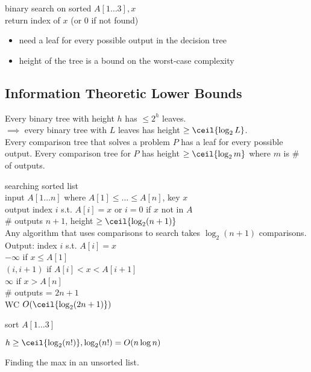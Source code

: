 \mpex

\noindent binary search on sorted $A[1 \ldots 3],x$ \\
return index of $x$ (or 0 if not found) 

\begin{itemize}
	\item need a leaf for every possible output in the decision tree
	\item height of the tree is a bound on the worst-case complexity
\end{itemize}

\subsection*{Information Theoretic Lower Bounds}

\noindent Every binary tree with height $h$ has $\leq 2^h$ leaves. \\
$\implies$ every binary tree with $L$ leaves has height $\geq \ceil{\log_2 L}$.
\\

\noindent Every comparison tree that solves a problem $P$ has a leaf for every
possible output. Every comparison tree for $P$ has height $\geq \ceil{\log_2 m}$
where $m$ is \# of outputs. \\

\mpex

\noindent searching sorted list \\
input $A[1 \ldots n]$ where $A[1] \leq \ldots \leq A[n]$, key $x$ \\
output index $i$ s.t. $A[i]=x$ or $i=0$ if $x$ not in $A$ \\
\# outputs $n+1$, height $\geq \ceil{\log_2 (n+1)}$ \\

\noindent Any algorithm that uses comparisons to search takes $\log_2 (n+1)$
comparisons.\\

\noindent Output: index $i$ s.t. $A[i]=x$ \\
$- \infty$ if $x \leq A[1]$ \\
$(i,i+1)$ if $A[i] < x < A[i+1]$ \\
$\infty$ if $x > A[n]$ \\

\noindent \# outputs = $2n+1$ \\

\noindent WC $O(\ceil{\log_2 (2n+1)})$ \\

\mpex

\noindent sort $A[1 \ldots 3]$

\noindent $h \geq \ceil{\log_2 (n!)}, \log_2 (n!) = O(n \log n)$

\mpex

\noindent Finding the max in an unsorted list.































